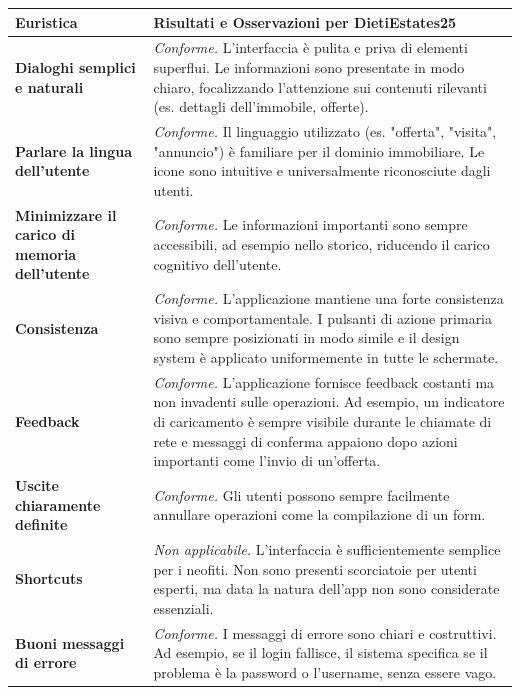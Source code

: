 \documentclass{book}
\begin{document}
\begin{table}[H]
    \centering
    \def\arraystretch{1.5}
    \begin{tabularx}{\linewidth}{|p{3cm}|X|}
        \hline
        \textbf{Euristica} & \textbf{Risultati e Osservazioni per DietiEstates25} \\
        \hline
        \textbf{Dialoghi semplici e naturali} & \textit{Conforme.} L'interfaccia è pulita e priva di elementi superflui. Le informazioni sono presentate in modo chiaro, focalizzando l'attenzione sui contenuti rilevanti (es. dettagli dell'immobile, offerte). \\
        \hline
        \textbf{Parlare la lingua dell'utente} & \textit{Conforme.} Il linguaggio utilizzato (es. "offerta", "visita", "annuncio") è familiare per il dominio immobiliare. Le icone sono intuitive e universalmente riconosciute dagli utenti. \\
        \hline
        \textbf{Minimizzare il carico di memoria dell'utente} & \textit{Conforme.} Le informazioni importanti sono sempre accessibili, ad esempio nello storico, riducendo il carico cognitivo dell'utente. \\
        \hline
        \textbf{Consistenza} & \textit{Conforme.} L'applicazione mantiene una forte consistenza visiva e comportamentale. I pulsanti di azione primaria sono sempre posizionati in modo simile e il design system è applicato uniformemente in tutte le schermate. \\
        \hline
        \textbf{Feedback} & \textit{Conforme.} L'applicazione fornisce feedback costanti ma non invadenti sulle operazioni. Ad esempio, un indicatore di caricamento è sempre visibile durante le chiamate di rete e messaggi di conferma appaiono dopo azioni importanti come l'invio di un'offerta. \\
        \hline
        \textbf{Uscite chiaramente definite} & \textit{Conforme.} Gli utenti possono sempre facilmente annullare operazioni come la compilazione di un form. \\
        \hline
        \textbf{Shortcuts} & \textit{Non applicabile.} L'interfaccia è sufficientemente semplice per i neofiti. Non sono presenti scorciatoie per utenti esperti, ma data la natura dell'app non sono considerate essenziali. \\
        \hline
        \textbf{Buoni messaggi di errore} & \textit{Conforme.} I messaggi di errore sono chiari e costruttivi. Ad esempio, se il login fallisce, il sistema specifica se il problema è la password o l'username, senza essere vago. \\

\end{tabularx}
\end{table}
\end{document}
